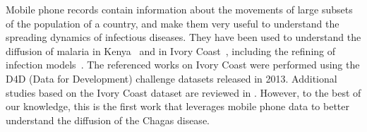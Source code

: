 Mobile phone records contain information about the movements of large subsets of the population of a country, and make them very useful to understand the spreading dynamics of infectious diseases. They have been used to understand the diffusion of malaria in Kenya~\cite{wesolowski2012quantifying} and in Ivory Coast~\cite{enns2013human}, including the refining of infection models~\cite{chunara2013large}. 
The referenced works on Ivory Coast were performed using the D4D (Data for Development) challenge datasets released in 2013. Additional studies based on the Ivory Coast dataset are reviewed in \cite{naboulsi2015mobile}.
However, to the best of our knowledge, this is the first work that leverages mobile phone data to better understand the diffusion of the Chagas disease.

